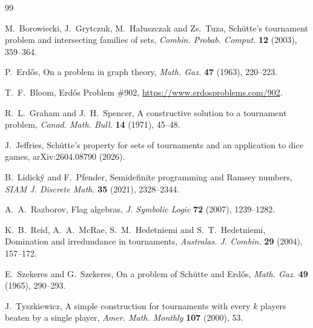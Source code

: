 \documentclass[11pt]{amsart}
\theoremstyle{definition}
\theoremstyle{remark}
\begin{document}
\begin{thebibliography}{99}

M.~Borowiecki, J.~Grytczuk, M.~Ha\l uszczak and Zs.~Tuza,
\newblock Sch\"utte's tournament problem and intersecting families of sets,
\newblock \emph{Combin. Probab. Comput.} \textbf{12} (2003), 359--364.

P.~Erd\H{o}s,
\newblock On a problem in graph theory,
\newblock \emph{Math. Gaz.} \textbf{47} (1963), 220--223.

T.~F.~Bloom,
\newblock Erd\H{o}s Problem \#902,
\newblock \url{https://www.erdosproblems.com/902}.

R.~L.~Graham and J.~H.~Spencer,
\newblock A constructive solution to a tournament problem,
\newblock \emph{Canad. Math. Bull.} \textbf{14} (1971), 45--48.

J.~Jeffries,
\newblock Sch\"utte's property for sets of tournaments and an application to dice games,
\newblock arXiv:2604.08790 (2026).

B.~Lidick\'y and F.~Pfender,
\newblock Semidefinite programming and Ramsey numbers,
\newblock \emph{SIAM J. Discrete Math.} \textbf{35} (2021), 2328--2344.

A.~A.~Razborov,
\newblock Flag algebras,
\newblock \emph{J. Symbolic Logic} \textbf{72} (2007), 1239--1282.

K.~B.~Reid, A.~A.~McRae, S.~M.~Hedetniemi and S.~T.~Hedetniemi,
\newblock Domination and irredundance in tournaments,
\newblock \emph{Australas. J. Combin.} \textbf{29} (2004), 157--172.

E.~Szekeres and G.~Szekeres,
\newblock On a problem of Sch\"utte and Erd\H{o}s,
\newblock \emph{Math. Gaz.} \textbf{49} (1965), 290--293.

J.~Tyszkiewicz,
\newblock A simple construction for tournaments with every $k$ players beaten by a single player,
\newblock \emph{Amer. Math. Monthly} \textbf{107} (2000), 53.

\end{thebibliography}
\end{document}
